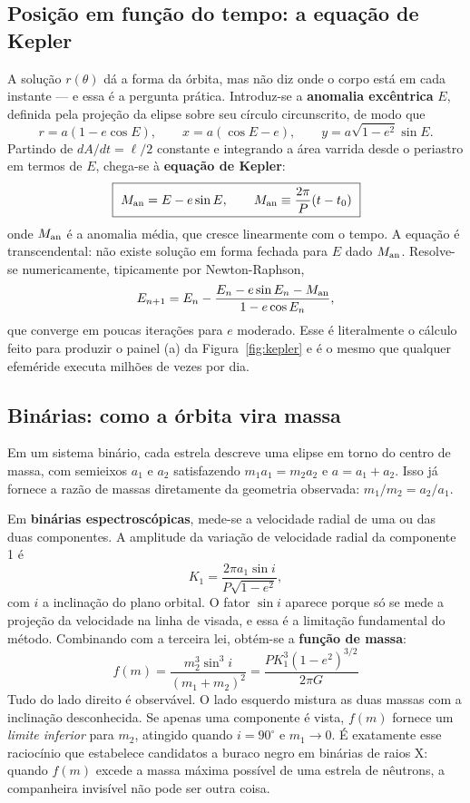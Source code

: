 \documentclass[11pt,a4paper]{article}
\begin{document}
\subsection*{Posição em função do tempo: a equação de Kepler}

A solução $r(\theta)$ dá a forma da órbita, mas não diz onde o corpo está em cada instante --- e essa é a pergunta prática. Introduz-se a \textbf{anomalia excêntrica} $E$, definida pela projeção da elipse sobre seu círculo circunscrito, de modo que
\[
r=a(1-e\cos E),\qquad
x=a(\cos E-e),\qquad
y=a\sqrt{1-e^{2}}\sin E.
\]
Partindo de $dA/dt=\ell/2$ constante e integrando a área varrida desde o periastro em termos de $E$, chega-se à \textbf{equação de Kepler}:
\[
\boxed{\ M_{\rm an}=E-e\sin E,\qquad M_{\rm an}\equiv\frac{2\pi}{P}(t-t_0)\ }
\]
onde $M_{\rm an}$ é a anomalia média, que cresce linearmente com o tempo. A equação é transcendental: não existe solução em forma fechada para $E$ dado $M_{\rm an}$. Resolve-se numericamente, tipicamente por Newton-Raphson,
\[
E_{n+1}=E_{n}-\frac{E_{n}-e\sin E_{n}-M_{\rm an}}{1-e\cos E_{n}},
\]
que converge em poucas iterações para $e$ moderado. Esse é literalmente o cálculo feito para produzir o painel (a) da Figura~\ref{fig:kepler} e é o mesmo que qualquer efeméride executa milhões de vezes por dia.

\subsection*{Binárias: como a órbita vira massa}

Em um sistema binário, cada estrela descreve uma elipse em torno do centro de massa, com semieixos $a_1$ e $a_2$ satisfazendo $m_1a_1=m_2a_2$ e $a=a_1+a_2$. Isso já fornece a razão de massas diretamente da geometria observada: $m_1/m_2=a_2/a_1$.

Em \textbf{binárias espectroscópicas}, mede-se a velocidade radial de uma ou das duas componentes. A amplitude da variação de velocidade radial da componente 1 é
\[
K_1=\frac{2\pi a_1\sin i}{P\sqrt{1-e^{2}}},
\]
com $i$ a inclinação do plano orbital. O fator $\sin i$ aparece porque só se mede a projeção da velocidade na linha de visada, e essa é a limitação fundamental do método. Combinando com a terceira lei, obtém-se a \textbf{função de massa}:
\[
\boxed{\ f(m)=\frac{m_2^{3}\sin^{3}i}{(m_1+m_2)^{2}}=\frac{P K_1^{3}(1-e^{2})^{3/2}}{2\pi G}\ }
\]
Tudo do lado direito é observável. O lado esquerdo mistura as duas massas com a inclinação desconhecida. Se apenas uma componente é vista, $f(m)$ fornece um \emph{limite inferior} para $m_2$, atingido quando $i=90^\circ$ e $m_1\to0$. É exatamente esse raciocínio que estabelece candidatos a buraco negro em binárias de raios X: quando $f(m)$ excede a massa máxima possível de uma estrela de nêutrons, a companheira invisível não pode ser outra coisa.
\end{document}

